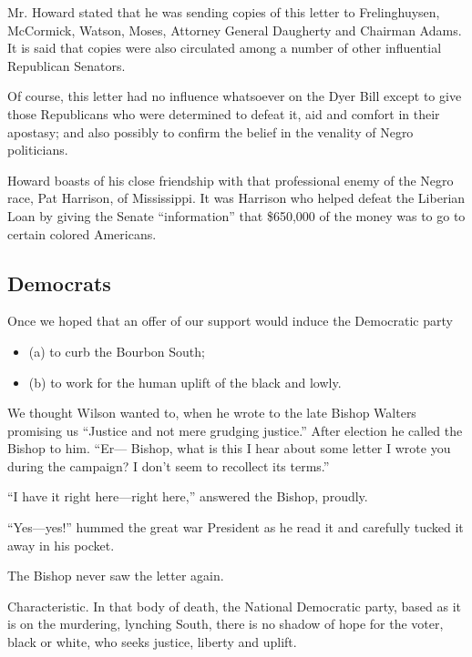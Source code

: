 \documentclass[letterpaper,10pt,english]{jupyterBook}
\begin{document}
\sphinxAtStartPar
Mr. Howard stated that he was sending copies of this letter to Frelinghuysen, McCormick, Watson, Moses, Attorney General Daugherty and Chairman Adams. It is said that copies were also circulated among a number of other influential Republican Senators.

\sphinxAtStartPar
Of course, this letter had no influence whatsoever on the Dyer Bill except to give those Republicans who were determined to defeat it, aid and comfort in their apostasy; and also possibly to confirm the belief in the venality of Negro politicians.

\sphinxAtStartPar
Howard boasts of his close friendship with that professional enemy of the Negro race, Pat Harrison, of Mississippi. It was Harrison who helped defeat the Liberian Loan by giving the Senate “information” that \$650,000 of the money was to go to certain colored Americans.


\subsection{Democrats}
\label{\detokenize{Volumes/24/03/intentions:democrats}}
\sphinxAtStartPar
Once we hoped that an offer of our support would induce the Democratic party
\begin{itemize}
\item {} 
\sphinxAtStartPar
(a) to curb the Bourbon South;

\item {} 
\sphinxAtStartPar
(b) to work for the human uplift of the black and lowly.

\end{itemize}

\sphinxAtStartPar
We thought Wilson wanted to, when he wrote to the late Bishop Walters promising us “Justice and not mere grudging justice.” After election he called the Bishop to him. “Er— Bishop, what is this I hear about some letter I wrote you during the campaign? I don’t seem to recollect its terms.”

\sphinxAtStartPar
“I have it right here—right here,” answered the Bishop, proudly.

\sphinxAtStartPar
“Yes—yes!” hummed the great war President as he read it and carefully tucked it away in his pocket.

\sphinxAtStartPar
The Bishop never saw the letter again.

\sphinxAtStartPar
Characteristic. In that body of death, the National Democratic party, based as it is on the murdering, lynching South, there is no shadow of hope for the voter, black or white, who seeks justice, liberty and uplift.
\end{document}
